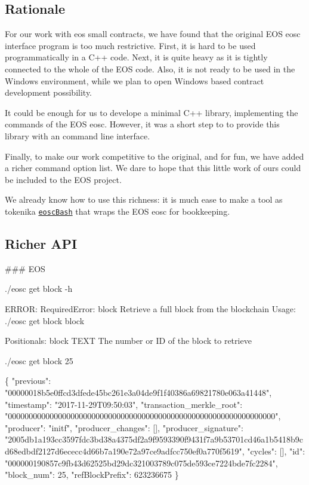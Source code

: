 \subsection*{Rationale}

For our work with eos small contracts, we have found that the original E\+OS {\ttfamily eosc} interface program is too much restrictive. First, it is hard to be used programmatically in a C++ code. Next, it is quite heavy as it is tightly connected to the whole of the E\+OS code. Also, it is not ready to be used in the Windows environment, while we plan to open Windows based contract development possibility.

It could be enough for us to develope a minimal C++ library, implementing the commands of the E\+OS {\ttfamily eosc}. However, it was a short step to to provide this library with an command line interface.

Finally, to make our work competitive to the original, and for fun, we have added a richer command option list. We dare to hope that this little work of ours could be included to the E\+OS project.

We already know how to use this richness\+: it is much ease to make a tool as tokenika \href{#}{\tt {\ttfamily eosc\+Bash}} that wraps the E\+OS {\ttfamily eosc} for bookkeeping.

\subsection*{Richer A\+PI}

\#\#\# E\+OS 
\begin{DoxyCode}
./eosc get block -h
\end{DoxyCode}
 
\begin{DoxyCode}
ERROR: RequiredError: block
Retrieve a full block from the blockchain
Usage: ./eosc get block block

Positionals:
  block TEXT                  The number or ID of the block to retrieve
\end{DoxyCode}
 
\begin{DoxyCode}
./eosc get block 25
\end{DoxyCode}
 
\begin{DoxyCode}
\{
  "previous": "00000018b5e0ffcd3dfede45bc261e3a04de9f1f40386a69821780e063a41448",
  "timestamp": "2017-11-29T09:50:03",
  "transaction\_merkle\_root": "0000000000000000000000000000000000000000000000000000000000000000",
  "producer": "initf",
  "producer\_changes": [],
  "producer\_signature":
       "2005db1a193cc3597fdc3bd38a4375df2a9f9593390f9431f7a9b53701cd46a1b5418b9cd68edbdf2127d6ececc4d66b7a190e72a97ce9adfcc750ef0a770f5619",
  "cycles": [],
  "id": "000000190857c9fb43d62525bd29dc321003789c075de593ce7224bde7fc2284",
  "block\_num": 25,
  "refBlockPrefix": 623236675
\}
\end{DoxyCode}


